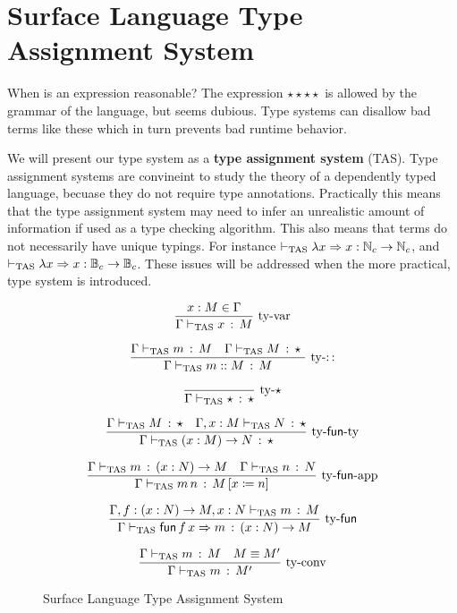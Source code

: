\section{Surface Language Type Assignment System}

When is an expression reasonable? The expression $\star\star\star\star$ is allowed by the grammar of the language, but seems dubious.
Type systems can disallow bad terms like these which in turn prevents bad runtime behavior.

We will present our type system as a \textbf{type assignment system} (\ac{TAS}).
Type assignment systems are convineint to study the theory of a dependently typed language, becuase they do not require type annotations. %
Practically this means that the type assignment system may need to infer an unrealistic amount of information if used as a type checking algorithm.
This also means that terms do not necessarily have unique typings.
For instance $\vdash_{\mathrm{TAS}}\lambda x\Rightarrow x:\mathbb{N}_{c}\rightarrow\mathbb{N}_{c}$, and $\vdash_{\mathrm{TAS}}\lambda x\Rightarrow x:\mathbb{B}_{c}\rightarrow\mathbb{B}_{c}$.
These issues will be addressed when the more practical, \bidir{} type system is introduced. 

\begin{figure}
\[
\frac{x:M\in\Gamma}{\Gamma\vdash_{\mathrm{TAS}} x\,:\,M}\,\operatorname{ty-var}
\]

\[
\frac{\Gamma\vdash_{\mathrm{TAS}} m\,:\,M \quad \Gamma\vdash_{\mathrm{TAS}} M\,:\,\star\
}{\Gamma\vdash_{\mathrm{TAS}} m::M\,:\,M}
\,\operatorname{ty-::}
\]

\[
\frac{{\color{gray}\ }}{\Gamma\tasys\star\,:\,\star}\,\rulename{ty-\star}
\]

\[
\frac{\Gamma\vdash_{\mathrm{TAS}} M\,:\,\star\quad\Gamma,x:M\vdash_{\mathrm{TAS}} N\,:\,\star}{\Gamma\vdash_{\mathrm{TAS}}\left(x:M\right)\rightarrow N\,:\,\star}\,\operatorname{ty-\mathsf{fun}-ty}
\]

\[
\frac{\Gamma\vdash_{\mathrm{TAS}} m\,:\,\left(x:N\right)\rightarrow M\quad\Gamma\vdash_{\mathrm{TAS}} n\,:\,N}{\Gamma\vdash_{\mathrm{TAS}} m\,n\,:\,M\left[x\coloneqq n\right]}\,\operatorname{ty-\mathsf{fun}-app}
\]

\[
\frac{\Gamma,f:\left(x:N\right)\rightarrow M,x:N\vdash_{\mathrm{TAS}} m\,:\,M}{\Gamma\vdash_{\mathrm{TAS}}\mathsf{fun}\,f\,x\Rightarrow m\,:\,\left(x:N\right)\rightarrow M}\,\operatorname{ty-\mathsf{fun}}
\]

\[
\frac{\Gamma\vdash_{\mathrm{TAS}} m\,:\,M\quad M\equiv M'}{\Gamma\vdash_{\mathrm{TAS}} m\,:\,M'}\,\operatorname{ty-conv}
\]

\caption{Surface Language Type Assignment System}
\label{fig:surface-TAS}
\end{figure}


